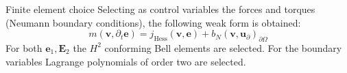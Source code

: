 \documentclass[aspectratio=169]{ISAE-Beamer}
\begin{document}
\begin{frame}{Finite element choice}
Selecting as control variables the forces and torques (Neumann boundary conditions), the following weak form is obtained:
\[ m(\bm{v}, \partial_t \bm{e}) = j_{\text{Hess}}(\bm{v}, \bm{e}) + b_N(\bm{v}, \bm{u}_\partial)_{\partial \Omega}
\]
For both $\bm{e}_1, \bm{E}_2$ the $H^2$ conforming Bell elements are selected. For the boundary variables Lagrange polynomials of order two are selected.
\end{frame}
\end{document}
